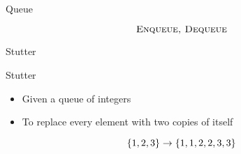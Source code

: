 \begin{frame}{}
  \centerline{\Large Queue}
\end{frame}

\begin{frame}{}

  \[
    \textsc{Enqueue, Dequeue}
  \]
\end{frame}

\begin{frame}{Stutter}
  \begin{exampleblock}{Stutter}
    \begin{itemize}
      \item Given a queue of integers 
      \item To replace every element with two copies of itself
    \end{itemize}

    \[
      \{1,2,3\} \to \{1,1,2,2,3,3\}
    \]
  \end{exampleblock}
\end{frame}
